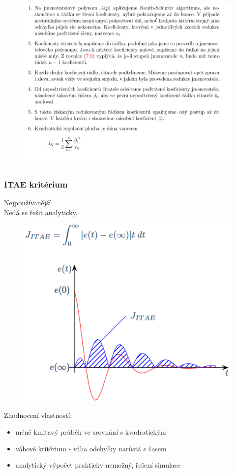 \begin{figure}[H]
    \includegraphics*[scale = 1]{images/nekolnehoDoplnek.png}
\end{figure}
\newpage

\subsubsection*{ITAE kritérium}
Nejpoužívanější\\
Nedá se řešit analyticky.\\
\begin{figure}[H]
    \includegraphics*[scale = 0.3]{images/ITAE.png}
\end{figure}
Zhodnocení vlastností:
\begin{itemize}
    \item méně kmitavý průběh ve srovnání s kvadratickým
    \item váhové kritérium - váha odchylky narůstá s časem
    \item analytický výpočet prakticky nemožný, řešení simulace
\end{itemize}
\newpage


